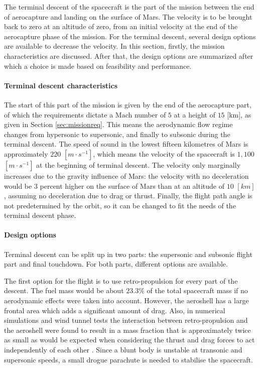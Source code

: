 The terminal descent of the spacecraft is the part of the mission between the end of aerocapture and landing on the surface of Mars. The velocity is to be brought back to zero at an altitude of zero, from an initial velocity at the end of the aerocapture phase of the mission. For the terminal descent, several design options are available to decrease the velocity. In this section, firstly, the mission characteristics are discussed. After that, the design options are summarized after which a choice is made based on feasibility and performance.

\paragraph{Terminal descent characteristics}
The start of this part of the mission is given by the end of the aerocapture part, of which the requirements dictate a Mach number of $5$ at a height of $15$ [km], as given in Section \ref{sec:missionreq}. This means the aerodynamic flow regime changes from hypersonic to supersonic, and finally to subsonic during the terminal descent. The speed of sound in the lowest fifteen kilometres of Mars is approximately $220$ $[m\cdot s^{-1}]$, which means the velocity of the spacecraft is $1,100$ $[m\cdot s^{-1}]$ at the beginning of terminal descent. The velocity only marginally increases due to the gravity influence of Mars: the velocity with no deceleration would be 3 percent higher on the surface of Mars than at an altitude of $10$ $[km]$, assuming no deceleration due to drag or thrust. Finally, the flight path angle is not predetermined by the orbit, so it can be changed to fit the needs of the terminal descent phase.

\paragraph{Design options}
Terminal descent can be split up in two parts: the supersonic and subsonic flight part and final touchdown. For both parts, different options are available.

The first option for the flight is to use retro-propulsion for every part of the descent. The fuel mass would be about $23.3\%$ of the total spacecraft mass if no aerodynamic effects were taken into account. However, the aeroshell has a large frontal area which adds a significant amount of drag. Also, in numerical simulations and wind tunnel tests the interaction between retro-propulsion and the aeroshell were found to result in a mass fraction that is approximately twice as small as would be expected when considering the thrust and drag forces to act independently of each other \cite{Korzun2009}. Since a blunt body is unstable at transonic and supersonic speeds, a small drogue parachute is needed to stabilise the spacecraft.

